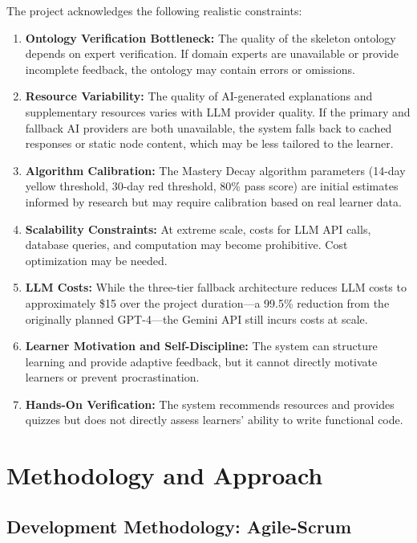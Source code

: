 The project acknowledges the following realistic constraints:
\begin{enumerate}
    \item \textbf{Ontology Verification Bottleneck:} The quality of the skeleton ontology depends on expert verification. If domain experts are unavailable or provide incomplete feedback, the ontology may contain errors or omissions.
    \item \textbf{Resource Variability:} The quality of AI-generated explanations and supplementary resources varies with LLM provider quality. If the primary and fallback AI providers are both unavailable, the system falls back to cached responses or static node content, which may be less tailored to the learner.
    \item \textbf{Algorithm Calibration:} The Mastery Decay algorithm parameters (14-day yellow threshold, 30-day red threshold, 80\% pass score) are initial estimates informed by research but may require calibration based on real learner data.
    \item \textbf{Scalability Constraints:} At extreme scale, costs for LLM API calls, database queries, and computation may become prohibitive. Cost optimization may be needed.
    \item \textbf{LLM Costs:} While the three-tier fallback architecture reduces LLM costs to approximately \$15 over the project duration---a 99.5\% reduction from the originally planned GPT-4---the Gemini API still incurs costs at scale.
    \item \textbf{Learner Motivation and Self-Discipline:} The system can structure learning and provide adaptive feedback, but it cannot directly motivate learners or prevent procrastination.
    \item \textbf{Hands-On Verification:} The system recommends resources and provides quizzes but does not directly assess learners' ability to write functional code.
\end{enumerate}

\section{Methodology and Approach}
\label{sec:methodology}

\subsection{Development Methodology: Agile-Scrum}

